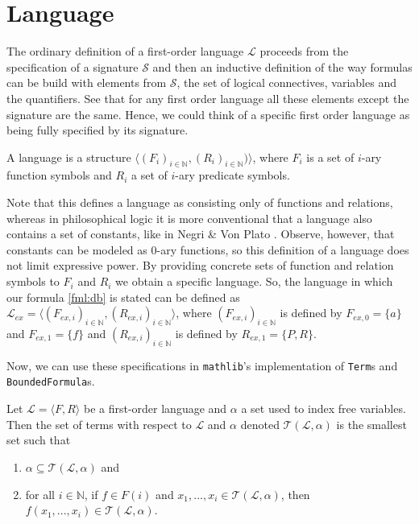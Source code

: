 \section{Language}\label{subsec:language}
The ordinary definition of a first-order language $\mathcal{L}$ proceeds from the specification of a signature $\mathcal{S}$ and then an inductive definition of the way formulas can be build with elements from $\mathcal{S}$, the set of logical connectives, variables and the quantifiers. See that for any first order language all these elements except the signature are the same. Hence, we could think of a specific first order language as being fully specified by its signature.

\begin{definition}\label{def:fol}
    A language is a structure $\langle(F_i)_{i\in \mathbb{N}}, (R_i)_{i\in \mathbb{N}})\rangle$, where $F_i$ is a set of $i$-ary function symbols and $R_i$ a set of $i$-ary predicate symbols.
\end{definition}

Note that this defines a language as consisting only of functions and relations, whereas in philosophical logic it is more conventional that a language also contains a set of constants, like in Negri \& Von Plato \cite{negri:2001}. Observe, however, that constants can be modeled as $0$-ary functions, so this definition of a language does not limit expressive power. By providing concrete sets of function and relation symbols to $F_i$ and $R_i$ we obtain a specific language. So, the language in which our formula \ref{fml:db} is stated can be defined as $\mathcal{L}_{ex} = \langle (F_{ex,i})_{i \in \mathbb{N}}, (R_{ex,i})_{i \in \mathbb{N}} \rangle$, where $(F_{ex,i})_{i \in \mathbb{N}}$ is defined by $F_{ex,0} = \{a\}$ and $F_{ex,1} = \{f\}$ and $(R_{ex,i})_{i \in \mathbb{N}}$ is defined by $R_{ex,1} = \{P, R\}$.

Now, we can use these specifications in \texttt{mathlib}'s implementation of \texttt{Term}s and \texttt{BoundedFormula}s.

\begin{definition}[Term]\label{def:term}
    Let $\mathcal{L} = \langle F, R \rangle$ be a first-order language and $\alpha$ a set used to index free variables. Then the set of terms with respect to $\mathcal{L}$ and $\alpha$ denoted $\mathcal{T}(\mathcal{L},\alpha)$ is the smallest set such that
        \begin{enumerate}
            \item $\alpha \subseteq \mathcal{T}(\mathcal{L},\alpha)$ and
            \item for all $i \in \mathbb{N}$, if $f \in F(i)$ and $x_1,...,x_i \in \mathcal{T}(\mathcal{L},\alpha)$, then $f(x_1,...,x_i) \in \mathcal{T}(\mathcal{L},\alpha)$.
        \end{enumerate}
\end{definition}

